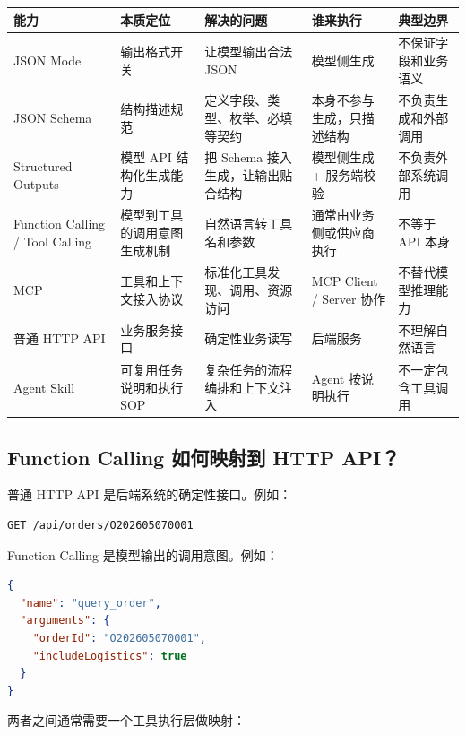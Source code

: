 \documentclass[10pt,a4paper]{ctexart}
\begin{document}
{\footnotesize
\begin{tabularx}{\textwidth}{|X|X|X|X|X|}
\hline
\textbf{能力} & \textbf{本质定位} & \textbf{解决的问题} & \textbf{谁来执行} & \textbf{典型边界} \\
\hline
JSON Mode & 输出格式开关 & 让模型输出合法 JSON & 模型侧生成 & 不保证字段和业务语义 \\
\hline
JSON Schema & 结构描述规范 & 定义字段、类型、枚举、必填等契约 & 本身不参与生成，只描述结构 & 不负责生成和外部调用 \\
\hline
Structured Outputs & 模型 API 结构化生成能力 & 把 Schema 接入生成，让输出贴合结构 & 模型侧生成 + 服务端校验 & 不负责外部系统调用 \\
\hline
Function Calling / Tool Calling & 模型到工具的调用意图生成机制 & 自然语言转工具名和参数 & 通常由业务侧或供应商执行 & 不等于 API 本身 \\
\hline
MCP & 工具和上下文接入协议 & 标准化工具发现、调用、资源访问 & MCP Client / Server 协作 & 不替代模型推理能力 \\
\hline
普通 HTTP API & 业务服务接口 & 确定性业务读写 & 后端服务 & 不理解自然语言 \\
\hline
Agent Skill & 可复用任务说明和执行 SOP & 复杂任务的流程编排和上下文注入 & Agent 按说明执行 & 不一定包含工具调用 \\
\hline
\end{tabularx}
}



\subsection{Function Calling 如何映射到 HTTP API？}


普通 HTTP API 是后端系统的确定性接口。例如：



\begin{lstlisting}[language=http]
GET /api/orders/O202605070001
\end{lstlisting}



Function Calling 是模型输出的调用意图。例如：



\begin{lstlisting}[language=json]
{
  "name": "query_order",
  "arguments": {
    "orderId": "O202605070001",
    "includeLogistics": true
  }
}
\end{lstlisting}



两者之间通常需要一个工具执行层做映射：
\end{document}
